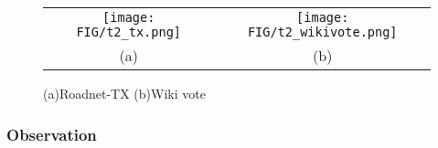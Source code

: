 \begin{figure}[h]
\begin{center}
\begin{tabular}{cc}
     \texttt{[image: FIG/t2\_tx.png]} &
     \texttt{[image: FIG/t2\_wikivote.png]} \\
    (a) & (b) 
\end{tabular}
\caption{(a)Roadnet-TX (b)Wiki vote}
\label{t2:5}
\end{center}
\end{figure}


\subsubsection{Observation}






